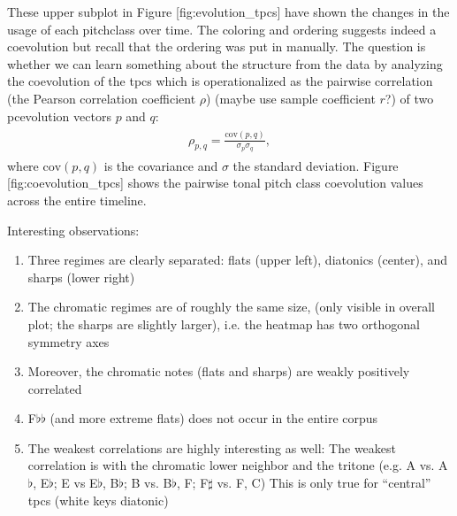 \documentclass[letterpaper,10pt,english]{sphinxmanual}
\begin{document}
\sphinxAtStartPar
These upper subplot in Figure {[}fig:evolution\_tpcs{]} have shown the
changes in the usage of each pitch\sphinxhyphen{}class over time. The coloring and
ordering suggests indeed a coevolution but recall that the ordering was
put in manually. The question is whether we can learn something about
the structure from the data by analyzing the coevolution of the tpcs
which is operationalized as the pairwise correlation (the Pearson
correlation coefficient \(\rho\)) (maybe use sample coefficient
\(r\)?) of two pc\sphinxhyphen{}evolution vectors \(p\) and \(q\):
\begin{equation*}
\begin{split}\begin{aligned}
\rho_{p,q} = \frac{\mathrm{cov}(p,q)}{\sigma_p\sigma_q},\end{aligned}\end{split}
\end{equation*}
\sphinxAtStartPar
where \(\mathrm{cov}(p,q)\) is the covariance and \(\sigma\)
the standard deviation. Figure {[}fig:coevolution\_tpcs{]} shows the
pairwise tonal pitch class coevolution values across the entire
timeline.

\sphinxAtStartPar
Interesting observations:
\begin{enumerate}
%
\item {} 
\sphinxAtStartPar
Three regimes are clearly separated: flats (upper left), diatonics
(center), and sharps (lower right)

\item {} 
\sphinxAtStartPar
The chromatic regimes are of roughly the same size, (only visible in
overall plot; the sharps are slightly larger), i.e. the heatmap has
two orthogonal symmetry axes

\item {} 
\sphinxAtStartPar
Moreover, the chromatic notes (flats and sharps) are weakly
positively correlated

\item {} 
\sphinxAtStartPar
F\(\flat\flat\) (and more extreme flats) does not occur in the
entire corpus

\item {} 
\sphinxAtStartPar
The weakest correlations are highly interesting as well: The weakest
correlation is with the chromatic lower neighbor and the tritone
(e.g. A vs. A\(\flat\), E\(\flat\); E vs
E\(\flat\), B\(\flat\); B vs. B\(\flat\), F;
F\(\sharp\) vs. F, C) This is only true for “central” tpcs
(white keys diatonic)

\end{enumerate}
\end{document}
